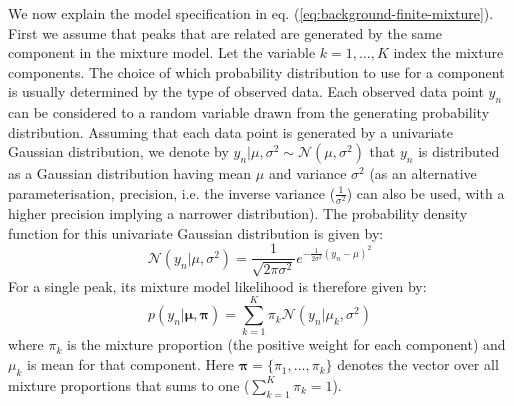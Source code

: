 We now explain the model specification in eq. (\ref{eq:background-finite-mixture}). First we assume that peaks that are related are generated by the same component in the mixture model. Let the variable $k=1,...,K$ index the mixture components. The choice of which probability distribution to use for a component is usually determined by the type of observed data. Each observed data point $y_n$ can be considered to a random variable drawn from the generating probability distribution. Assuming that each data point is generated by a univariate Gaussian distribution, we denote by $y_n \vert \mu, \sigma^2 \sim \mathcal{N}(\mu, \sigma^2)$ that $y_n$ is distributed as a Gaussian distribution having mean $\mu$ and variance $\sigma^2$ (as an alternative parameterisation, precision, i.e. the inverse variance ($\frac{1}{\sigma^2}$) can also be used, with a higher precision implying a narrower distribution). The probability density function for this univariate Gaussian distribution is given by:
\begin{equation}
\mathcal{N}(y_n \vert \mu, \sigma^2) = \frac{1}{\sqrt{2\pi\sigma^2}}e^{-\frac{1}{2\sigma^2}(y_n-\mu)^2}
\end{equation}
For a single peak, its mixture model likelihood is therefore given by:
\begin{equation}
p(y_n \vert \boldsymbol{\mu},\boldsymbol{\pi}) = \sum_{k=1}^{K} \pi_k \mathcal{N}(y_n \vert \mu_k,\sigma^2)
\end{equation}
where $\pi_k$ is the mixture proportion (the positive weight for each component) and $\mu_k$ is mean for that component. Here $\boldsymbol{\pi}=\{\pi_{1},...,\pi_{k}\}$ denotes the vector over all mixture proportions that sums to one ($\sum_{k=1}^{K}\pi_{k}=1$). 


